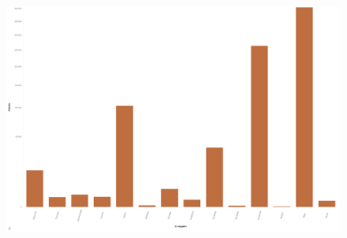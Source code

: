 \begin{figure}[h]
    \centering
    \includegraphics[width=\textwidth]{figures/tpot-overview-attacks.png}
    \caption[]{}
    \label{fig:tpot-2}
\end{figure}

